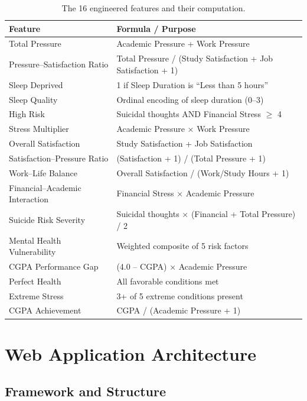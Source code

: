 \documentclass[11pt,a4paper]{article}
\begin{document}
\begin{table}[htbp]
\centering
\small
\begin{tabularx}{\textwidth}{lX}
\toprule
\textbf{Feature} & \textbf{Formula / Purpose} \\
\midrule
Total Pressure & Academic Pressure + Work Pressure \\
Pressure--Satisfaction Ratio & Total Pressure / (Study Satisfaction + Job Satisfaction + 1) \\
Sleep Deprived & 1 if Sleep Duration is ``Less than 5 hours'' \\
Sleep Quality & Ordinal encoding of sleep duration (0--3) \\
High Risk & Suicidal thoughts AND Financial Stress $\ge$ 4 \\
Stress Multiplier & Academic Pressure $\times$ Work Pressure \\
Overall Satisfaction & Study Satisfaction + Job Satisfaction \\
Satisfaction--Pressure Ratio & (Satisfaction + 1) / (Total Pressure + 1) \\
Work--Life Balance & Overall Satisfaction / (Work/Study Hours + 1) \\
Financial--Academic Interaction & Financial Stress $\times$ Academic Pressure \\
Suicide Risk Severity & Suicidal thoughts $\times$ (Financial + Total Pressure) / 2 \\
Mental Health Vulnerability & Weighted composite of 5 risk factors \\
CGPA Performance Gap & (4.0 -- CGPA) $\times$ Academic Pressure \\
Perfect Health & All favorable conditions met \\
Extreme Stress & 3+ of 5 extreme conditions present \\
CGPA Achievement & CGPA / (Academic Pressure + 1) \\
\bottomrule
\end{tabularx}
\caption{The 16 engineered features and their computation.}
\end{table}

\section{Web Application Architecture}
\label{sec:webapp}

\subsection{Framework and Structure}
\end{document}

